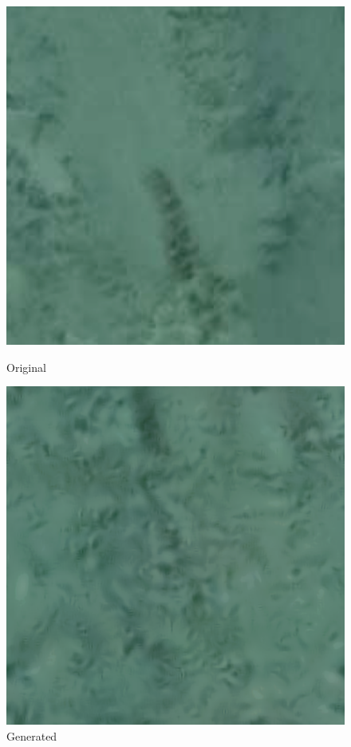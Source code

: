 \documentclass{article}
\begin{document}
    \begin{figure}[!htb]
    \begin{center}
      \includegraphics[scale=.34]{5/report/steerable/5.png}
      \caption{Original}
    \end{center}
    \endminipage \hfill
    \begin{center}
      \includegraphics[scale=.34]{5/report/steerable/5_c.png}
      \caption{Generated}
    \end{center}
    \endminipage
    \end{figure} 
\end{document}
